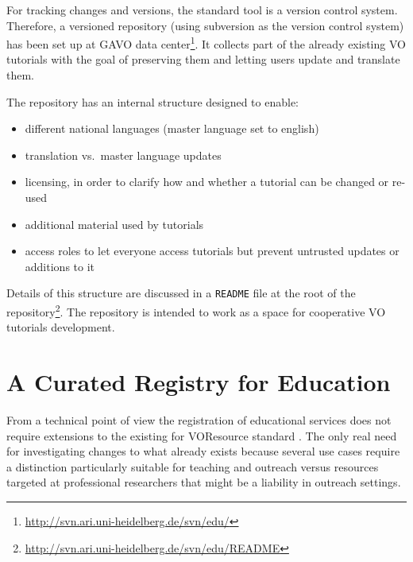 \documentclass{ivoa}
\begin{document}
For tracking changes and versions, the standard tool is a version
control system.  Therefore,
a versioned repository (using subversion as the version control system) 
has been set up at GAVO data
center\footnote{\url{http://svn.ari.uni-heidelberg.de/svn/edu/}}.
It collects part of the
already existing VO tutorials with the goal of preserving them and
letting users 
update and translate them.

The repository has an internal structure designed to enable:

\begin{itemize}

\item different national languages (master language set to english){}

\item translation vs.~master language updates{}

\item licensing, in order to clarify how and whether a tutorial can be changed or re-used{}

\item additional material used by tutorials

\item access roles to let everyone access tutorials but prevent untrusted updates or additions to it

\end{itemize}

Details of this structure are discussed in a \texttt{README} file at the
root of the
repository\footnote{\url{http://svn.ari.uni-heidelberg.de/svn/edu/README}}.
The repository is intended to work as a space for cooperative 
VO tutorials development.



\section{A Curated Registry for Education}

\label{sect:curreg}


From a technical point of view the registration of educational services
does not require extensions
to the existing for VOResource standard \citep{2008ivoa.spec.0222P}.
The only real need for investigating changes to what already exists
because several
use cases require a distinction particularly suitable for teaching and
outreach
versus resources targeted at professional researchers that might be a
liability in outreach settings.
\end{document}
